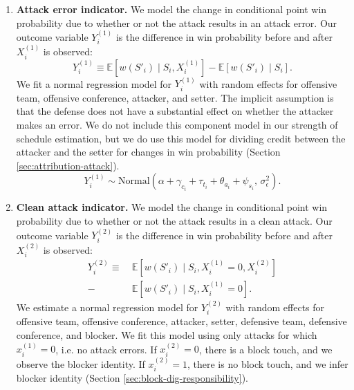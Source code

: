 \documentclass{article}
\begin{document}
\begin{enumerate}
    \item
        {\bf Attack error indicator.} We model the change in conditional point win probability due to whether or not the attack results in an attack error. Our outcome variable $Y_i^{(1)}$ is the difference in win probability before and after $X_i^{(1)}$ is observed:
        \begin{equation*}
            Y_i^{(1)} \equiv \mathbb{E}\left[w(S'_i) \mid S_i, X_i^{(1)}\right] - \mathbb{E}\left[w(S'_i) \mid S_i\right].
        \end{equation*}
        We fit a normal regression model for $Y_i^{(1)}$ with random effects for offensive team, offensive conference, attacker, and setter. The implicit assumption is that the defense does not have a substantial effect on whether the attacker makes an error. We do not include this component model in our strength of schedule estimation, but we do use this model for dividing credit between the attacker and the setter for changes in win probability (Section \ref{sec:attribution-attack}).
        \begin{equation}
        \label{eqn:attack-model-1}
            Y_i^{(1)} \sim \mbox{Normal}\left(
                \alpha + \gamma_{c_i} + \tau_{t_i} + \theta_{a_i} + \psi_{s_i},\,
                \sigma^2_\epsilon
            \right).
        \end{equation}
    \item
        {\bf Clean attack indicator.} We model the change in conditional point win probability due to whether or not the attack results in a clean attack. Our outcome variable $Y_i^{(2)}$ is the difference in win probability before and after $X_i^{(2)}$ is observed:
        \begin{align*}
            Y_i^{(2)} \equiv &~\mathbb{E}\left[w(S'_i) \mid S_i, X_i^{(1)} = 0, X_i^{(2)}\right]\\
            - &~\mathbb{E}\left[w(S'_i) \mid S_i, X_i^{(1)} = 0\right].
        \end{align*}
        We estimate a normal regression model for $Y_i^{(2)}$ with random effects for offensive team, offensive conference, attacker, setter, defensive team, defensive conference, and blocker. We fit this model using only attacks for which $x_i^{(1)} = 0$, i.e. no attack errors. If $x_i^{(2)} = 0$, there is a block touch, and we observe the blocker identity. If $x_i^{(2)} = 1$, there is no block touch, and we infer blocker identity (Section \ref{sec:block-dig-responsibility}).

\end{enumerate}
\end{document}
